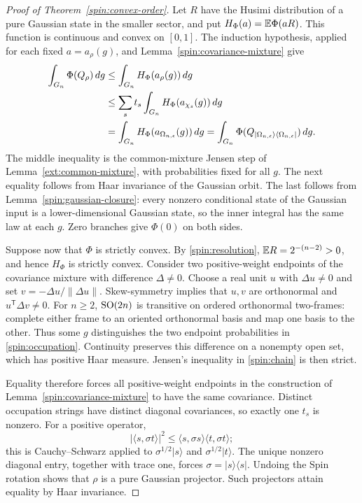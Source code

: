 \begin{proof}[Proof of Theorem~\ref{spin:convex-order}]
Let $R$ have the Husimi distribution of a pure Gaussian state in the
smaller sector, and put $H_\Phi(a)=\mathbb E\Phi(aR)$.
This function is continuous and convex on $[0,1]$.
The induction hypothesis, applied for each fixed $a=a_\rho(g)$,
and Lemma~\ref{spin:covariance-mixture} give
\begin{align}
 \int_{G_n}\Phi(Q_\rho)\,dg
 &\le\int_{G_n}H_\Phi(a_\rho(g))\,dg \notag\\
 &\le\sum_st_s\int_{G_n}H_\Phi(a_{\chi_s}(g))\,dg \notag\\
 &=\int_{G_n}H_\Phi(a_{\Omega_{n,\epsilon}}(g))\,dg
 =\int_{G_n}\Phi(Q_{|\Omega_{n,\epsilon}\rangle
                         \langle\Omega_{n,\epsilon}|})\,dg.
 \label{spin:chain}
\end{align}
The middle inequality is the common-mixture Jensen step of
Lemma~\ref{ext:common-mixture}, with probabilities fixed for all $g$.
The next equality follows from Haar invariance of the Gaussian orbit.
The last follows from Lemma~\ref{spin:gaussian-closure}: every nonzero
conditional state of the Gaussian input is a lower-dimensional
Gaussian state, so the inner integral has the same law at each $g$.
Zero branches give $\Phi(0)$ on both sides.

Suppose now that $\Phi$ is strictly convex.  By
\eqref{spin:resolution}, $\mathbb E R=2^{-(n-2)}>0$, and hence $H_\Phi$
is strictly convex.  Consider two positive-weight endpoints of the
covariance mixture with difference $\Delta\ne0$.  Choose a real unit
$u$ with $\Delta u\ne0$ and set
$v=-\Delta u/\|\Delta u\|$.  Skew-symmetry implies that $u,v$ are
orthonormal and $u^{\mathsf T}\Delta v\ne0$.
For $n\ge2$, $\operatorname{SO}(2n)$ is transitive on ordered orthonormal
two-frames: complete either frame to an oriented orthonormal basis
and map one basis to the other.  Thus some $g$ distinguishes the two
endpoint probabilities in \eqref{spin:occupation}.  Continuity
preserves this difference on a nonempty open set, which has positive
Haar measure.  Jensen's inequality in \eqref{spin:chain} is then
strict.

Equality therefore forces all positive-weight endpoints in the
construction of Lemma~\ref{spin:covariance-mixture} to have the same
covariance.  Distinct occupation strings have distinct diagonal
covariances, so exactly one $t_s$ is nonzero.  For a positive operator,
\[
 |\langle s,\sigma t\rangle|^2
 \le\langle s,\sigma s\rangle\langle t,\sigma t\rangle;
\]
this is Cauchy--Schwarz applied to $\sigma^{1/2}|s\rangle$ and
$\sigma^{1/2}|t\rangle$.  The unique nonzero diagonal entry, together
with trace one, forces $\sigma=|s\rangle\langle s|$.
Undoing the Spin rotation shows that $\rho$ is a pure Gaussian
projector.  Such projectors attain equality by Haar invariance.
\end{proof}

